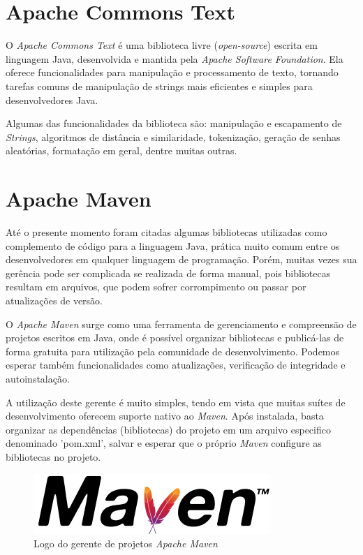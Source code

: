 \documentclass[
	12pt,			%
	openright,		%
	oneside,	
	a4paper,		%
	english,		%
	brazil			%
]{abntex2/abntex2}  %
\begin{document}
		\section{Apache Commons Text\texttrademark} \label{commons-text}
		
			O \textit{Apache Commons Text\texttrademark} \cite{commons-text} é uma biblioteca livre (\textit{open-source}) escrita em linguagem Java, desenvolvida e mantida pela \textit{Apache Software Foundation}. Ela oferece funcionalidades para manipulação e processamento de texto, tornando tarefas comuns de manipulação de strings mais eficientes e simples para desenvolvedores Java.
		
			Algumas das funcionalidades da biblioteca são: manipulação e escapamento de \textit{Strings}, algoritmos de distância e similaridade, tokenização, geração de senhas aleatórias, formatação em geral, dentre muitas outras.
		
		\section{Apache Maven} \label{maven}
		
			Até o presente momento foram citadas algumas bibliotecas utilizadas como complemento de código para a linguagem Java, prática muito comum entre os desenvolvedores em qualquer linguagem de programação. Porém, muitas vezes sua gerência pode ser complicada se realizada de forma manual, pois bibliotecas resultam em arquivos, que podem sofrer corrompimento ou passar por atualizações de versão.
		
			O \textit{Apache Maven} \cite{maven} surge como uma ferramenta de gerenciamento e compreensão de projetos escritos em Java, onde é possível organizar bibliotecas e publicá-las de forma gratuita para utilização pela comunidade de desenvolvimento. Podemos esperar também funcionalidades como atualizações, verificação de integridade e autoinstalação.
		
			A utilização deste gerente é muito simples, tendo em vista que muitas suítes de desenvolvimento oferecem suporte nativo ao \textit{Maven}. Após instalada, basta organizar as dependências (bibliotecas) do projeto em um arquivo especifico denominado 'pom.xml', salvar e esperar que o próprio \textit{Maven} configure as bibliotecas no projeto.
			
			\begin{figure}[ht]
				\begin{center}
					
					\caption{Logo do gerente de projetos \textit{Apache Maven}}
					\label{maven-img}
					
					\includegraphics[scale=0.5]{img/maven-logo}
					
					
				\end{center}
			\end{figure}
		
\end{document}
